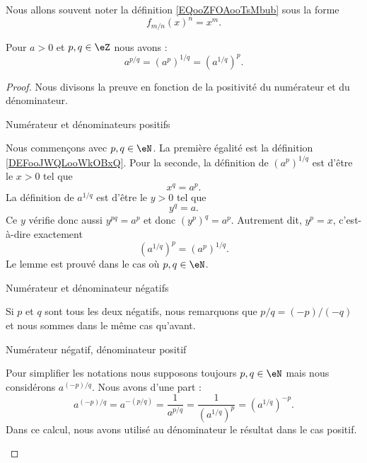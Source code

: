 Nous allons souvent noter la définition \eqref{EQooZFOAooTsMbub} sous la forme
\begin{equation}        \label{EQooZIKKooVfjkZo}
    f_{m/n}(x)^n=x^m.
\end{equation}

\begin{lemma}        \label{LEMooIDLJooZALNaD}
    Pour \( a>0\) et \( p,q\in \eZ\) nous avons :
    \begin{equation}
        a^{p/q}=(a^p)^{1/q}=(a^{1/q})^p.
    \end{equation}
\end{lemma}

\begin{proof}
    Nous divisons la preuve en fonction de la positivité du numérateur et du dénominateur.
    \begin{subproof}
        \item[Numérateur et dénominateurs positifs]
                
            Nous commençons avec \( p,q\in \eN\). La première égalité est la définition \ref{DEFooJWQLooWkOBxQ}. Pour la seconde, la définition de \( (a^p)^{1/q}\) est d'être le \( x>0\) tel que
            \begin{equation}
                x^q=a^p.
            \end{equation}
            La définition de \( a^{1/q}\) est d'être le \( y>0\) tel que
            \begin{equation}
                y^q=a.
            \end{equation}
            Ce \( y\) vérifie donc aussi \( y^{pq}=a^p\) et donc \( (y^p)^q=a^p\). Autrement dit, \( y^p=x\), c'est-à-dire exactement
            \begin{equation}
                (a^{1/q})^p=(a^p)^{1/q}.
            \end{equation}
            Le lemme est prouvé dans le cas où \( p,q\in \eN\).

        \item[Numérateur et dénominateur négatifs]

            Si \( p\) et \( q\) sont tous les deux négatifs, nous remarquons que \( p/q=(-p)/(-q)\) et nous sommes dans le même cas qu'avant.

        \item[Numérateur négatif, dénominateur positif]

            Pour simplifier les notations nous supposons toujours \( p,q\in \eN\) mais nous considérons \( a^{(-p)/q}\). Nous avons d'une part :
            \begin{equation}
                a^{(-p)/q}=a^{-(p/q)}=\frac{1}{ a^{p/q} }=\frac{1}{ (a^{1/q})^p }=(a^{1/q})^{-p}.   
            \end{equation}
            Dans ce calcul, nous avons utilisé au dénominateur le résultat dans le cas positif. 


\end{subproof}
\end{proof}

